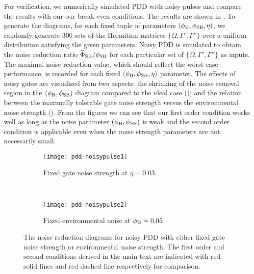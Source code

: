 \documentclass[pra,reprint,superscriptaddress]{revtex4-2}
\newcommand{\wt}[1]{\widetilde{#1}}
\begin{document}
For verification, we numerically simulated PDD with noisy pulses and compare the results with our our break even conditions. The results are shown in . 
To generate the diagrams, for each fixed tuple of parameters $(\phi_{\mathrm{B}},\phi_{\mathrm{SB}},\eta)$, we randomly generate 300 sets of the Hermitian matrices $\{\Omega,\Gamma',\Gamma''\}$ over a uniform distribution 
satisfying the given parameters. Noisy PDD is simulated to obtain the noise reduction ratio $\wt\Phi_\rSB/\phi_\rSB$ for each particular set of $\{\Omega,\Gamma',\Gamma''\}$ as inputs. The maximal noise reduction value, which should reflect the worst case performance, is recorded for each fixed $(\phi_{\mathrm{B}},\phi_{\mathrm{SB}},\eta)$ parameter. 
The effects of noisy gates are visualized from two aspects: the shrinking of the noise removal region in the $(\phi_{\mathrm{B}},\phi_{\mathrm{SB}})$ diagram compared to the ideal case (); and the relation between the maximally tolerable gate noise strength versus the environmental noise strength
 (). From the figures we can see that our first order condition works well as long as the noise parameter $(\phi_{\mathrm{B}},\phi_{\mathrm{SB}})$ is weak and the second order condition is applicable even when the noise strength parameters are not necessarily small.



 \begin{figure}
 \centering
\begin{subfigure}{0.9\linewidth}
\texttt{[image: pdd-noisypulse1]}
\caption{Fixed gate noise strength at $\eta =0.03$.}
\label{fig:pdd-noisy-pulse1}
\end{subfigure}
\\
\begin{subfigure}{0.9\linewidth}
\texttt{[image: pdd-noisypulse2]}
\caption{Fixed environmental noise at $\phi_{\mathrm{B}} =0.05$.}
\label{fig:pdd-noisy-pulse2}
\end{subfigure}
\caption{The noise reduction diagrams for noisy PDD with either fixed gate noise strength or environmental noise strength. The first order and second conditions derived in the main text are indicated with red solid lines and red dashed line respectively for comparison. }
\label{fig:pdd-noisy-pulse}
\end{figure}
\end{document}
